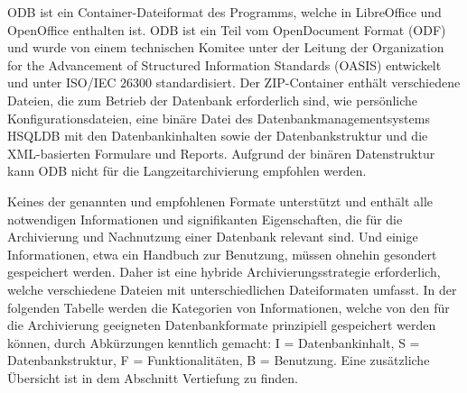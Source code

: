 ODB ist ein Container-Dateiformat des Programms, welche in LibreOffice und OpenOffice enthalten ist. ODB ist ein Teil vom OpenDocument Format (ODF) und wurde von einem technischen Komitee unter der Leitung der Organization for the Advancement of Structured Information Standards (OASIS) entwickelt und unter ISO/IEC 26300 standardisiert. Der ZIP-Container enthält verschiedene Dateien, die zum Betrieb der Datenbank erforderlich sind, wie persönliche Konfigurationsdateien, eine binäre Datei des Datenbankmanagementsystems HSQLDB mit den  Datenbankinhalten sowie der Datenbankstruktur und die XML-basierten Formulare und Reports. Aufgrund der binären Datenstruktur kann ODB nicht für die Langzeitarchivierung empfohlen werden.

Keines der genannten und empfohlenen Formate unterstützt und enthält alle notwendigen Informationen und signifikanten Eigenschaften, die für die Archivierung und Nachnutzung einer Datenbank relevant sind. Und einige Informationen, etwa ein Handbuch zur Benutzung, müssen ohnehin gesondert gespeichert werden. Daher ist eine hybride Archivierungsstrategie erforderlich, welche verschiedene Dateien mit unterschiedlichen Dateiformaten umfasst. In der folgenden Tabelle werden die Kategorien von Informationen, welche von den für die Archivierung geeigneten Datenbankformate prinzipiell gespeichert werden können, durch Abkürzungen kenntlich gemacht: I = Datenbankinhalt, S = Datenbankstruktur, F = Funktionalitäten, B = Benutzung. Eine zusätzliche Übersicht ist in dem Abschnitt Vertiefung zu finden.

